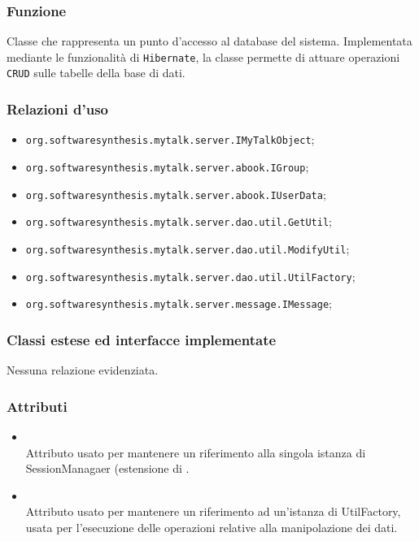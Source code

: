 
\subsubsection*{Funzione}
Classe che rappresenta un punto d'accesso al database del sistema. Implementata mediante le funzionalità di \texttt{Hibernate}, la classe permette di attuare operazioni \texttt{CRUD} sulle tabelle della base di dati.

\subsubsection*{Relazioni d'uso}

\begin{itemize}
	\item \texttt{org.softwaresynthesis.mytalk.server.IMyTalkObject};
	\item \texttt{org.softwaresynthesis.mytalk.server.abook.IGroup};
	\item \texttt{org.softwaresynthesis.mytalk.server.abook.IUserData};
	\item \texttt{org.softwaresynthesis.mytalk.server.dao.util.GetUtil};
	\item \texttt{org.softwaresynthesis.mytalk.server.dao.util.ModifyUtil};
	\item \texttt{org.softwaresynthesis.mytalk.server.dao.util.UtilFactory};
	\item \texttt{org.softwaresynthesis.mytalk.server.message.IMessage};
\end{itemize}

\subsubsection*{Classi estese ed interfacce implementate}

Nessuna relazione evidenziata.

\subsubsection*{Attributi}

\begin{itemize}
	\item{}\\
	Attributo usato per mantenere un riferimento alla singola istanza di SessionManagaer (estensione di .
	\item{}\\
	Attributo usato per mantenere un riferimento ad un'istanza di UtilFactory, usata per l'esecuzione delle operazioni relative alla manipolazione dei dati.
\end{itemize}

